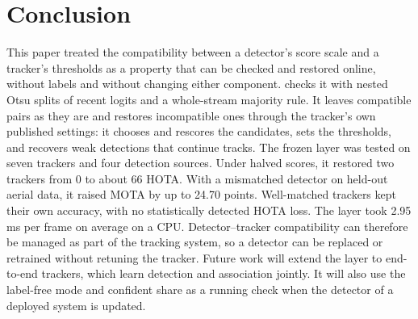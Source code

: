 \section{Conclusion}\label{sec:conclusion}

This paper treated the compatibility between a detector's score scale and a tracker's thresholds
as a property that can be checked and restored online, without labels and without changing either
component. \scl{} checks it with nested Otsu splits of recent logits and a whole-stream majority
rule. It leaves compatible pairs as they are and restores incompatible ones through the tracker's
own published settings: it chooses and rescores the candidates, sets the thresholds, and recovers
weak detections that continue tracks. The frozen layer was tested on seven trackers and four
detection sources. Under halved scores, it restored two trackers from 0 to about 66 HOTA. With a
mismatched detector on held-out aerial data, it raised MOTA by up to 24.70 points. Well-matched
trackers kept their own accuracy, with no statistically detected HOTA loss. The layer took 2.95 ms
per frame on average on a CPU. Detector--tracker compatibility can therefore be managed as part of
the tracking system, so a detector can be replaced or retrained without retuning the tracker.
Future work will extend the layer to end-to-end trackers, which learn detection and association
jointly. It will also use the label-free mode and confident share as a running check when the
detector of a deployed system is updated.
